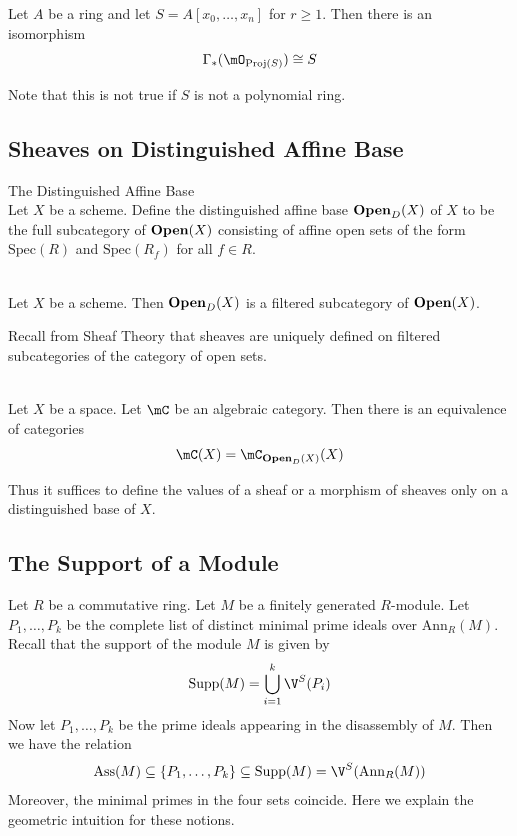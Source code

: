 \documentclass[a4paper]{article}
\begin{document}
\begin{lmm}{}{} Let $A$ be a ring and let $S=A[x_0,\dots,x_n]$ for $r\geq 1$. Then there is an isomorphism $$\Gamma_\ast(\mO_{\text{Proj}(S)})\cong S$$
\end{lmm}

Note that this is not true if $S$ is not a polynomial ring. 

\subsection{Sheaves on Distinguished Affine Base}
\begin{defn}{The Distinguished Affine Base}{}\\
Let $X$ be a scheme. Define the distinguished affine base $\bold{Open}_{D}(X)$ of $X$ to be the full subcategory of $\bold{Open}(X)$ consisting of affine open sets of the form $\text{Spec}(R)$ and $\text{Spec}(R_f)$ for all $f\in R$. 
\end{defn}

\begin{lmm}{}{}\\
Let $X$ be a scheme. Then $\bold{Open}_D(X)$ is a filtered subcategory of $\bold{Open}(X)$. 
\end{lmm}

Recall from Sheaf Theory that sheaves are uniquely defined on filtered subcategories of the category of open sets. 

\begin{crl}{}{}\\
Let $X$ be a space. Let $\mC$ be an algebraic category. Then there is an equivalence of categories $$\mC(X)=\mC_{\bold{Open}_D(X)}(X)$$
\end{crl}

Thus it suffices to define the values of a sheaf or a morphism of sheaves only on a distinguished base of $X$. 

\subsection{The Support of a Module}
Let $R$ be a commutative ring. Let $M$ be a finitely generated $R$-module. Let $P_1,\dots,P_k$ be the complete list of distinct minimal prime ideals over $\text{Ann}_R(M)$. Recall that the support of the module $M$ is given by $$\text{Supp}(M)=\bigcup_{i=1}^k\V^S(P_i)$$ Now let $P_1,\dots,P_k$ be the prime ideals appearing in the disassembly of $M$. Then we have the relation $$\text{Ass}(M)\subseteq\{P_1,\dots,P_k\}\subseteq\text{Supp}(M)=\V^S(\text{Ann}_R(M))$$ Moreover, the minimal primes in the four sets coincide. Here we explain the geometric intuition for these notions. \\
\end{document}

